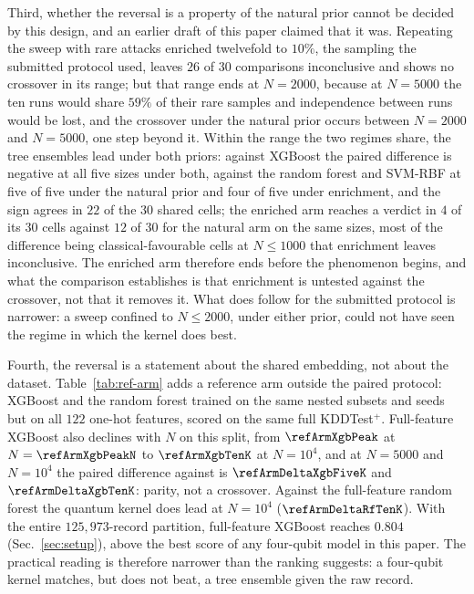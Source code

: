 \begin{revbody}
Third, whether the reversal is a property of the natural prior cannot be
decided by this design, and an earlier draft of this paper claimed that it was.
Repeating the sweep with rare attacks enriched twelvefold to $10\%$, the
sampling the submitted protocol used, leaves $26$ of $30$ comparisons
inconclusive and shows no crossover in its range; but that range ends at
$N=2000$, because at $N=5000$ the ten runs would share $59\%$ of their rare
samples and independence between runs would be lost, and the crossover under
the natural prior occurs between $N=2000$ and $N=5000$, one step beyond it.
Within the range the two regimes share, the tree ensembles lead under both
priors: against XGBoost the paired difference is negative at all five sizes
under both, against the random forest and SVM-RBF at five of five under the
natural prior and four of five under enrichment, and the sign agrees in $22$ of
the $30$ shared cells; the enriched arm reaches a verdict in $4$ of its $30$
cells against $12$ of $30$ for the natural arm on the same sizes, most of the
difference being classical-favourable cells at $N\leq1000$ that enrichment
leaves inconclusive. The enriched arm therefore ends before the phenomenon begins, and
what the comparison establishes is that enrichment is untested against the
crossover, not that it removes it. What does follow for the submitted protocol
is narrower: a sweep confined to $N\leq2000$, under either prior, could not have
seen the regime in which the kernel does best.

Fourth, the reversal is a statement about the shared embedding, not about the
dataset. Table~\ref{tab:ref-arm} adds a reference arm outside the paired
protocol: XGBoost and the random forest trained on the same nested subsets and
seeds but on all $122$ one-hot features, scored on the same full KDDTest$^+$.
Full-feature XGBoost also declines with $N$ on this split, from
$\refArmXgbPeak$ at $N=\refArmXgbPeakN$ to $\refArmXgbTenK$ at $N=10^4$, and at
$N=5000$ and $N=10^4$ the paired difference against \QSVM{} is
$\refArmDeltaXgbFiveK$ and $\refArmDeltaXgbTenK$: parity, not a crossover.
Against the full-feature random forest the quantum kernel does lead at
$N=10^4$ ($\refArmDeltaRfTenK$). With the entire $125{,}973$-record partition,
full-feature XGBoost reaches $0.804$ (Sec.~\ref{sec:setup}), above the best
score of any four-qubit model in this paper. The practical reading is
therefore narrower than the ranking suggests: a four-qubit kernel matches, but
does not beat, a tree ensemble given the raw record.

\end{revbody}

